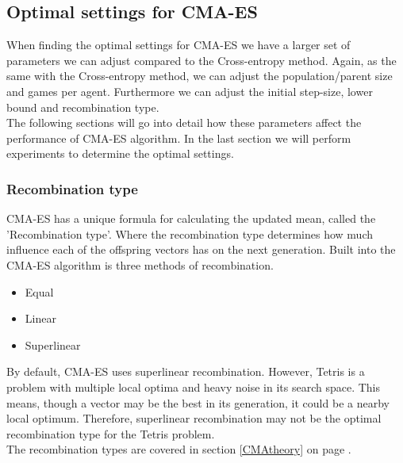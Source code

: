 \subsection{Optimal settings 
for CMA-ES \label{optimalsettingscma}}

When finding the optimal settings for CMA-ES we have a larger set of parameters we can adjust compared
to the Cross-entropy method. Again, as the same with the Cross-entropy method, we can adjust the population/parent size and
games per agent. Furthermore we can adjust the initial step-size, lower bound and recombination type.\\
The following sections will go into detail how these parameters affect the performance of CMA-ES
algorithm. In the last section we will perform experiments to determine the optimal settings.


\subsubsection{Recombination type}
CMA-ES has a unique formula for calculating the updated mean,
called the 'Recombination type'. Where the recombination type
determines how much influence each of the offspring vectors has on the next
generation. Built into the CMA-ES algorithm is three methods of recombination. 
\begin{itemize}
\item Equal
\item Linear
\item Superlinear
\end{itemize}
By default, CMA-ES uses superlinear recombination. However, Tetris is a problem
with multiple local optima and heavy noise in its search space. This means, though a vector may be the best in its generation, it could be a nearby local optimum. Therefore, superlinear recombination may not be the optimal recombination type for the Tetris problem.\\

The recombination types are covered in section \ref{CMAtheory} on 
page \pageref{eq:recomType}.


